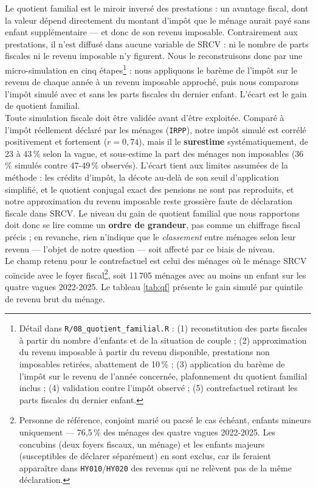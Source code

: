 \documentclass[12pt,a4paper]{article}
\begin{document}
Le quotient familial est le miroir inversé des prestations : un avantage fiscal, dont la valeur dépend directement du montant d'impôt que le ménage aurait payé sans enfant supplémentaire — et donc de son revenu imposable. Contrairement aux prestations, il n'est diffusé dans aucune variable de SRCV : ni le nombre de parts fiscales ni le revenu imposable n'y figurent. Nous le reconstruisons donc par une micro-simulation en cinq étapes\footnote{Détail dans \texttt{R/08\_quotient\_familial.R} : (1) reconstitution des parts fiscales à partir du nombre d'enfants et de la situation de couple ; (2) approximation du revenu imposable à partir du revenu disponible, prestations non imposables retirées, abattement de 10\,\% ; (3) application du barème de l'impôt sur le revenu de l'année concernée, plafonnement du quotient familial inclus ; (4) validation contre l'impôt observé ; (5) contrefactuel retirant les parts fiscales du dernier enfant.} : nous appliquons le barème de l'impôt sur le revenu de chaque année à un revenu imposable approché, puis nous comparons l'impôt simulé avec et sans les parts fiscales du dernier enfant. L'écart est le gain de quotient familial. \\

\noindent Toute simulation fiscale doit être validée avant d'être exploitée. Comparé à l'impôt réellement déclaré par les ménages (\texttt{IRPP}), notre impôt simulé est corrélé positivement et fortement ($r = 0{,}74$), mais il le \textbf{surestime} systématiquement, de 23 à 43\,\% selon la vague, et sous-estime la part des ménages non imposables (36\,\% simulés contre 47-49\,\% observés). L'écart tient aux limites assumées de la méthode : les crédits d'impôt, la décote au-delà de son seuil d'application simplifié, et le quotient conjugal exact des pensions ne sont pas reproduits, et notre approximation du revenu imposable reste grossière faute de déclaration fiscale dans SRCV. Le niveau du gain de quotient familial que nous rapportons doit donc se lire comme un \textbf{ordre de grandeur}, pas comme un chiffrage fiscal précis ; en revanche, rien n'indique que le \textit{classement} entre ménages selon leur revenu — l'objet de notre question — soit affecté par ce biais de niveau. \\

\noindent Le champ retenu pour le contrefactuel est celui des ménages où le ménage SRCV coïncide avec le foyer fiscal\footnote{Personne de référence, conjoint marié ou pacsé le cas échéant, enfants mineurs uniquement — 76,5\,\% des ménages des quatre vagues 2022-2025. Les concubins (deux foyers fiscaux, un ménage) et les enfants majeurs (susceptibles de déclarer séparément) en sont exclus, car ils feraient apparaître dans \texttt{HY010}/\texttt{HY020} des revenus qui ne relèvent pas de la même déclaration.}, soit 11\,705 ménages avec au moins un enfant sur les quatre vagues 2022-2025. Le tableau \ref{tab:qf} présente le gain simulé par quintile de revenu brut du ménage. \\
\end{document}
